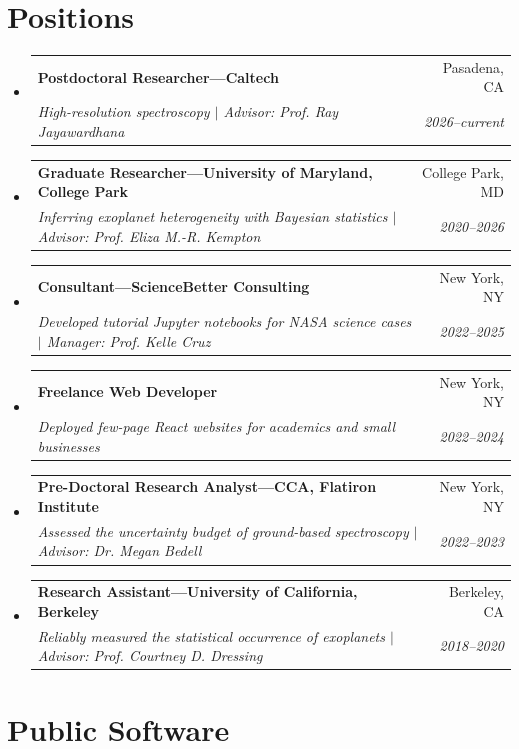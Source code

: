 \documentclass[letterpaper,11pt]{article}
\makeatletter
\newcommand{\resumeSubheading}[4]{
  \vspace{-1pt}\item[]
  \begin{tabular*}{0.98\textwidth}{l@{\extracolsep{\fill}}r}
      \hspace{-10pt}\textbf{#1} & #2 \\
      \hspace{-10pt}\textit{\small#3} & \textit{\small #4} \\
    \end{tabular*}\vspace{-5pt}
}
\newcommand{\resumeSubHeadingListStart}{\begin{itemize}[leftmargin=*]}
\newcommand{\resumeSubHeadingListEnd}{\end{itemize}}
\newcommand{\shorterSection}[1]{\vspace{-10pt}\section{#1}}
\makeatother
\begin{document}
  \vspace{-10pt}
\shorterSection{Positions}
  \resumeSubHeadingListStart
  \resumeSubheading
      {Postdoctoral Researcher---Caltech}{Pasadena, CA}
      {High-resolution spectroscopy $\vert$ Advisor: Prof. Ray Jayawardhana}{2026--current}{
    }
\vspace{-20pt}
      \resumeSubheading
      {Graduate Researcher---University of Maryland, College Park}{College Park, MD}
      {Inferring exoplanet heterogeneity with Bayesian statistics $\vert$ Advisor: Prof. Eliza M.-R. Kempton}{2020--2026}{
    }

    
\vspace{-20pt}

  \resumeSubheading
      {Consultant---ScienceBetter Consulting}{New York, NY}
      {Developed tutorial Jupyter notebooks for NASA science cases $\vert$ Manager: Prof. Kelle Cruz}{2022--2025}{
    }
\vspace{-20pt}
 \resumeSubheading
      {Freelance Web Developer}{New York, NY}
      {Deployed few-page React websites for academics and small businesses}{2022--2024}{
    }

\vspace{-20pt}
 

      \resumeSubheading
      {Pre-Doctoral Research Analyst---CCA, Flatiron Institute}{New York, NY}
      {Assessed the uncertainty budget of ground-based spectroscopy $\vert$ Advisor: Dr. Megan Bedell}{2022--2023}{
    }
    \vspace{-20pt}
    \resumeSubheading
      {Research Assistant---University of California, Berkeley}{Berkeley, CA}
      {Reliably measured the statistical occurrence of exoplanets $\vert$ Advisor: Prof. Courtney D. Dressing}{2018--2020}{
    }

\vspace{-2pt}
  \resumeSubHeadingListEnd

\vspace{-12pt}

\shorterSection{Public Software}
\end{document}
